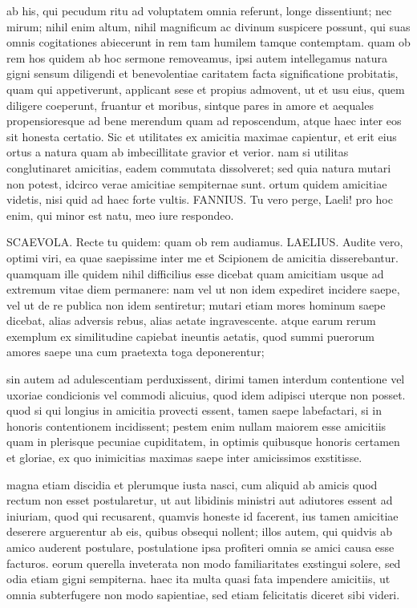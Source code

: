  ab his, qui pecudum ritu ad voluptatem omnia referunt, longe dissentiunt; nec mirum; nihil enim altum, nihil magnificum ac divinum suspicere possunt, qui suas omnis cogitationes abiecerunt in rem tam humilem tamque contemptam. quam ob rem hos quidem ab hoc sermone removeamus, ipsi autem intellegamus natura gigni sensum diligendi et benevolentiae caritatem facta significatione probitatis, quam qui appetiverunt, applicant sese et propius admovent, ut et usu eius, quem diligere coeperunt, fruantur et moribus, sintque pares in amore et aequales propensioresque ad bene merendum quam ad reposcendum, atque haec inter eos sit honesta certatio. Sic et utilitates ex amicitia maximae capientur, et erit eius ortus a natura quam ab imbecillitate gravior et verior. nam si utilitas conglutinaret amicitias, eadem commutata dissolveret; sed quia natura mutari non potest, idcirco verae amicitiae sempiternae sunt. ortum quidem amicitiae videtis, nisi quid ad haec forte vultis. FANNIUS. Tu vero perge, Laeli! pro hoc enim, qui minor est natu, meo iure respondeo.

 SCAEVOLA. Recte tu quidem: quam ob rem audiamus. LAELIUS. Audite vero, optimi viri, ea quae saepissime inter me et Scipionem de amicitia disserebantur. quamquam ille quidem nihil difficilius esse dicebat quam amicitiam usque ad extremum vitae diem permanere: nam vel ut non idem expediret incidere saepe, vel ut de re publica non idem sentiretur; mutari etiam mores hominum saepe dicebat, alias adversis rebus, alias aetate ingravescente. atque earum rerum exemplum ex similitudine capiebat ineuntis aetatis, quod summi puerorum amores saepe una cum praetexta toga deponerentur;

 sin autem ad adulescentiam perduxissent, dirimi tamen interdum contentione vel uxoriae condicionis vel commodi alicuius, quod idem adipisci uterque non posset. quod si qui longius in amicitia provecti essent, tamen saepe labefactari, si in honoris contentionem incidissent; pestem enim nullam maiorem esse amicitiis quam in plerisque pecuniae cupiditatem, in optimis quibusque honoris certamen et gloriae, ex quo inimicitias maximas saepe inter amicissimos exstitisse.

 magna etiam discidia et plerumque iusta nasci, cum aliquid ab amicis quod rectum non esset postularetur, ut aut libidinis ministri aut adiutores essent ad iniuriam, quod qui recusarent, quamvis honeste id facerent, ius tamen amicitiae deserere arguerentur ab eis, quibus obsequi nollent; illos autem, qui quidvis ab amico auderent postulare, postulatione ipsa profiteri omnia se amici causa esse facturos. eorum querella inveterata non modo familiaritates exstingui solere, sed odia etiam gigni sempiterna. haec ita multa quasi fata impendere amicitiis, ut omnia subterfugere non modo sapientiae, sed etiam felicitatis diceret sibi videri.

